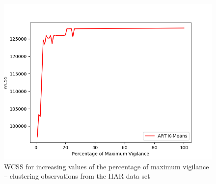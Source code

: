 \documentclass{l4proj}
\begin{document}
\begin{appendices}
\begin{figure}[H]
	\centering
    \includegraphics[width=1.0\textwidth]{images/result13}
    \caption{WCSS for increasing values of the percentage of maximum vigilance -- clustering observations from the HAR data set} 
    \label{fig:res13}
\end{figure}

\end{appendices}
\end{document}
